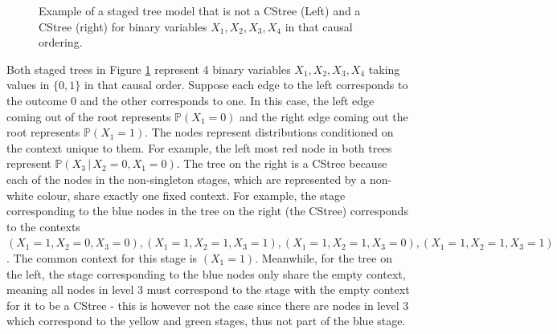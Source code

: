 \documentclass{tufte-book}
\begin{document}
\begin{figure}[!h]\label{fig:cstreestagedtree}
   \begin{floatrow}
%
\caption{Example of a staged tree model that is not a CStree (Left) and a CStree (right) for binary variables $X_1,X_2,X_3,X_4$ in that causal ordering.}
        
   \end{floatrow}
\end{figure}

Both staged trees in Figure \ref{fig:cstreestagedtree} represent 4 binary variables \(X_1,X_2,X_3,X_4\) taking values in \(\{0,1\}\) in that causal order. Suppose each edge to the left corresponds to the outcome \(0\) and the other corresponds to one. In this case, the left edge coming out of the root represents \(\mathbb{P}(X_1 = 0)\) and the right edge coming out the root represents \(\mathbb{P}(X_1 = 1)\). The nodes represent distributions conditioned on the context unique to them. For example, the left most red node in both trees represent \(\mathbb{P}(X_3 \,|\, X_2=0, X_1=0)\). The tree on the right is a CStree because each of the nodes in the non-singleton stages, which are represented by a non-white colour, share exactly one fixed context. For example, the stage corresponding to the blue nodes in the tree on the right (the CStree) corresponds to the contexts \((X_1=1, X_2=0, X_3=0), (X_1=1, X_2=1, X_3=1), (X_1=1, X_2=1, X_3=0), (X_1=1, X_2=1, X_3=1)\). The common context for this stage is  \((X_1=1)\). Meanwhile, for the tree on the left, the stage corresponding to the blue nodes only share the empty context, meaning all nodes in level 3 must correspond to the stage with the empty context for it to be a CStree - this is however not the case since there are nodes in level 3 which correspond to the yellow and green stages, thus not part of the blue stage. 
\end{document}
